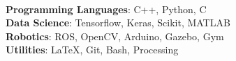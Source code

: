 \ifdefined\ONEPAGE
\\
\textbf{Programming Languages}: C++, Python, C\\
\textbf{Data Science}: Tensorflow, Keras, Scikit, MATLAB\\
\textbf{Robotics}: ROS, OpenCV, Arduino, Gazebo, Gym\\
\textbf{Utilities}:  \LaTeX, Git, Bash, Processing
\else
\fi
